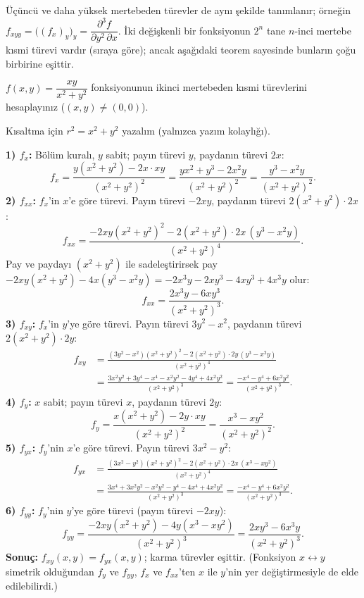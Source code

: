 Üçüncü ve daha yüksek mertebeden türevler de aynı şekilde tanımlanır; örneğin
$f_{xyy}=\big((f_x)_y\big)_y=\dfrac{\partial^3f}{\partial y^2\,\partial x}$. İki değişkenli bir fonksiyonun $2^n$ tane
$n$-inci mertebe kısmi türevi vardır (sıraya göre); ancak aşağıdaki teorem sayesinde bunların çoğu birbirine eşittir.

\begin{soru}
$f(x,y)=\dfrac{xy}{x^2+y^2}$ fonksiyonunun ikinci mertebeden kısmi türevlerini hesaplayınız ($(x,y)\ne(0,0)$).
\end{soru}
\begin{cevap}
Kısaltma için $r^2=x^2+y^2$ yazalım (yalnızca yazım kolaylığı).

\textbf{1) $f_x$:} Bölüm kuralı, $y$ sabit; payın türevi $y$, paydanın türevi $2x$:
\[
f_x=\frac{y(x^2+y^2)-2x\cdot xy}{(x^2+y^2)^2}=\frac{yx^2+y^3-2x^2y}{(x^2+y^2)^2}=\frac{y^3-x^2y}{(x^2+y^2)^2}.
\]
\textbf{2) $f_{xx}$:} $f_x$'in $x$'e göre türevi. Payın türevi $-2xy$, paydanın türevi $2(x^2+y^2)\cdot2x$:
\[
f_{xx}=\frac{-2xy(x^2+y^2)^2-2(x^2+y^2)\cdot2x\,(y^3-x^2y)}{(x^2+y^2)^4}.
\]
Pay ve paydayı $(x^2+y^2)$ ile sadeleştirirsek pay $-2xy(x^2+y^2)-4x(y^3-x^2y)=-2x^3y-2xy^3-4xy^3+4x^3y$ olur:
\[
f_{xx}=\frac{2x^3y-6xy^3}{(x^2+y^2)^3}.
\]
\textbf{3) $f_{xy}$:} $f_x$'in $y$'ye göre türevi. Payın türevi $3y^2-x^2$, paydanın türevi $2(x^2+y^2)\cdot2y$:
\begin{align*}
f_{xy}&=\frac{(3y^2-x^2)(x^2+y^2)^2-2(x^2+y^2)\cdot2y\,(y^3-x^2y)}{(x^2+y^2)^4}\\
&=\frac{3x^2y^2+3y^4-x^4-x^2y^2-4y^4+4x^2y^2}{(x^2+y^2)^3}
=\boxed{\frac{-x^4-y^4+6x^2y^2}{(x^2+y^2)^3}} .
\end{align*}
\textbf{4) $f_y$:} $x$ sabit; payın türevi $x$, paydanın türevi $2y$:
\[
f_y=\frac{x(x^2+y^2)-2y\cdot xy}{(x^2+y^2)^2}=\frac{x^3-xy^2}{(x^2+y^2)^2}.
\]
\textbf{5) $f_{yx}$:} $f_y$'nin $x$'e göre türevi. Payın türevi $3x^2-y^2$:
\begin{align*}
f_{yx}&=\frac{(3x^2-y^2)(x^2+y^2)^2-2(x^2+y^2)\cdot2x\,(x^3-xy^2)}{(x^2+y^2)^4}\\
&=\frac{3x^4+3x^2y^2-x^2y^2-y^4-4x^4+4x^2y^2}{(x^2+y^2)^3}
=\boxed{\frac{-x^4-y^4+6x^2y^2}{(x^2+y^2)^3}} .
\end{align*}
\textbf{6) $f_{yy}$:} $f_y$'nin $y$'ye göre türevi (payın türevi $-2xy$):
\[
f_{yy}=\frac{-2xy(x^2+y^2)-4y(x^3-xy^2)}{(x^2+y^2)^3}=\frac{2xy^3-6x^3y}{(x^2+y^2)^3}.
\]
\textbf{Sonuç:} $f_{xy}(x,y)=f_{yx}(x,y)$; karma türevler eşittir. (Fonksiyon $x\leftrightarrow y$ simetrik olduğundan
$f_y$ ve $f_{yy}$, $f_x$ ve $f_{xx}$'ten $x$ ile $y$'nin yer değiştirmesiyle de elde edilebilirdi.)
\end{cevap}

